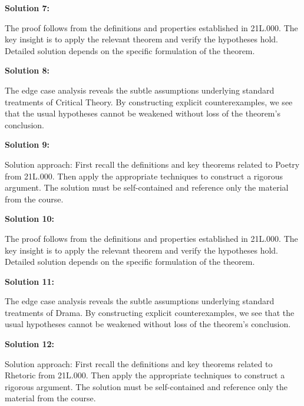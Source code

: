 \documentclass[12pt,a4paper]{exam}
\begin{document}
\vspace{0.5cm}

\textbf{Solution 7:}

The proof follows from the definitions and properties established in 21L.000. The key insight is to apply the relevant theorem and verify the hypotheses hold. Detailed solution depends on the specific formulation of the theorem.

\vspace{0.5cm}

\textbf{Solution 8:}

The edge case analysis reveals the subtle assumptions underlying standard treatments of Critical Theory. By constructing explicit counterexamples, we see that the usual hypotheses cannot be weakened without loss of the theorem's conclusion.

\vspace{0.5cm}

\textbf{Solution 9:}

Solution approach: First recall the definitions and key theorems related to Poetry from 21L.000. Then apply the appropriate techniques to construct a rigorous argument. The solution must be self-contained and reference only the material from the course.

\vspace{0.5cm}

\textbf{Solution 10:}

The proof follows from the definitions and properties established in 21L.000. The key insight is to apply the relevant theorem and verify the hypotheses hold. Detailed solution depends on the specific formulation of the theorem.

\vspace{0.5cm}

\textbf{Solution 11:}

The edge case analysis reveals the subtle assumptions underlying standard treatments of Drama. By constructing explicit counterexamples, we see that the usual hypotheses cannot be weakened without loss of the theorem's conclusion.

\vspace{0.5cm}

\textbf{Solution 12:}

Solution approach: First recall the definitions and key theorems related to Rhetoric from 21L.000. Then apply the appropriate techniques to construct a rigorous argument. The solution must be self-contained and reference only the material from the course.
\end{document}
